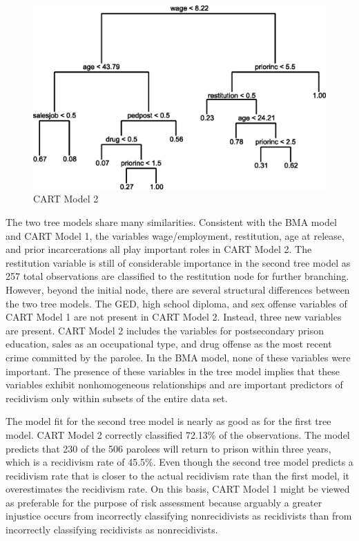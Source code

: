 \begin{figure}
\begin{center}
\includegraphics[scale=1]{tree02.eps}
\vspace{0.5cm}
\caption{CART Model 2}
\end{center}
\end{figure}

The two tree models share many similarities.  Consistent with the BMA model and CART Model 1, the variables wage/employment, restitution, age at release, and prior incarcerations all play important roles in CART Model 2.  The restitution variable is still of considerable importance in the second tree model as 257 total observations are classified to the restitution node for further branching.  However, beyond the initial node, there are several structural differences between the two tree models.  The GED, high school diploma, and sex offense variables of CART Model 1 are not present in CART Model 2.  Instead, three new variables are present.  CART Model 2 includes the variables for postsecondary prison education, sales as an occupational type, and drug offense as the most recent crime committed by the parolee.  In the BMA model, none of these variables were important.  The presence of these variables in the tree model implies that these variables exhibit nonhomogeneous relationships and are important predictors of recidivism only within subsets of the entire data set.

The model fit for the second tree model is nearly as good as for the first tree model.  CART Model 2 correctly classified 72.13\% of the observations.  The model predicts that 230 of the 506 parolees will return to prison within three years, which is a recidivism rate of 45.5\%.  Even though the second tree model predicts a recidivism rate that is closer to the actual recidivism rate than the first model, it overestimates the recidivism rate.  On this basis, CART Model 1 might be viewed as preferable for the purpose of risk assessment because arguably a greater injustice occurs from incorrectly classifying nonrecidivists as recidivists than from incorrectly classifying recidivists as nonrecidivists.

